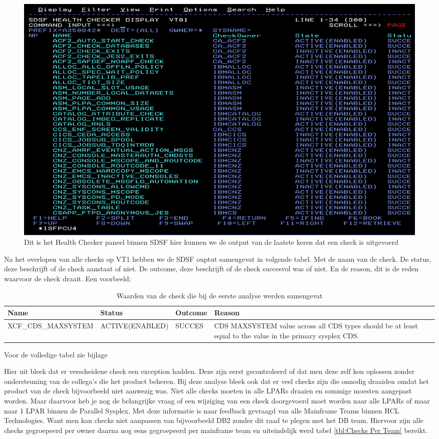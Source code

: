 \begin{figure}[h]
	\centering
	\includegraphics[width=0.7\linewidth]{img/SDSFCK}
	\caption[Health Checker Scherm binnen SDSF]{Dit is het Health Checker paneel binnen SDSF hier kunnen we de output van de laatste keren dat een check is uitgevoerd}
	\label{fig:sdsfck}
\end{figure}


Na het overlopen van alle checks op VT1 hebben we de SDSF ouptut samengevat in volgende tabel. Met de naam van de check. De status, deze beschrijft of de check aanstaat of niet. De outcome, deze beschrijft of de check succesvol was of niet. En de reason, dit is de reden waarvoor de check draait. Een voorbeeld:
\begin{table}
	\begin{tabular}{|p{5cm}|p{3.5cm}|p{1.5cm}|p{5cm}|}
		\hline
		\textbf{Name} & \textbf{Status} & \textbf{Outcome} & \textbf{Reason} \\
		\hline
		XCF\_CDS\_MAXSYSTEM & ACTIVE(ENABLED) & SUCCES & CDS MAXSYSTEM value across all CDS types should be at least equal to the value 
		in the primary sysplex CDS.  \\
		\hline
	\end{tabular}
	\caption[Individuele check]{Waarden van de check die bij de eerste analyse werden samengevat}
	\label{tbl:Individuele check}
\end{table}


Voor de volledige tabel zie bijlage 

Hier uit bleek dat er verscheidene check een exception hadden. Deze zijn eerst gecontroleerd of dat men deze zelf kon oplossen zonder ondersteuning van de collega's die het product beheren. Bij deze analyse bleek ook dat er veel checks zijn die onnodig draaiden omdat het product van de check bijvoorbeeld niet aanwezig was. Niet alle checks moeten in alle LPARs draaien en sommige moesten aangepast worden. Maar daarvoor heb je nog de belangrijke vraag of een wijziging van een check doorgevoerd moet worden naar alle LPARs of maar naar 1 LPAR binnen de Parallel Sysplex. Met deze informatie is naar feedback gevraagd van alle Mainframe Teams binnen HCL Technologies. Want men kan checks niet aanpassen van bijvoorbeeld DB2 zonder dit raad te plegen met het DB team. Hiervoor zijn alle checks gegroepeerd per owner daarna nog eens gegroepeerd per mainframe team en uiteindelijk werd tabel \ref{tbl:Checks Per Team} bereikt.

